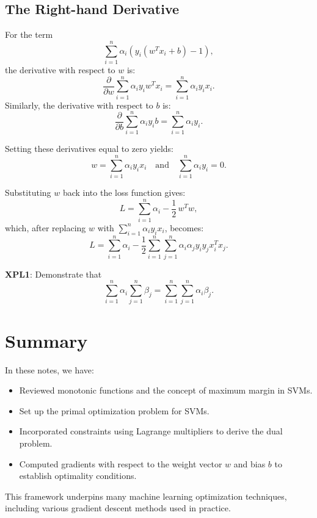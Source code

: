 \documentclass[11pt]{article}
\begin{document}
\subsection{The Right-hand Derivative}
For the term 
\[
\sum_{i=1}^{n} \alpha_i (y_i(w^T x_i + b) - 1),
\]
the derivative with respect to \(w\) is:
\[
\frac{\partial}{\partial w} \sum_{i=1}^{n} \alpha_i y_i w^T x_i = \sum_{i=1}^{n} \alpha_i y_i x_i.
\]
Similarly, the derivative with respect to \(b\) is:
\[
\frac{\partial}{\partial b} \sum_{i=1}^{n} \alpha_i y_i b = \sum_{i=1}^{n} \alpha_i y_i.
\]

Setting these derivatives equal to zero yields:
\[
w = \sum_{i=1}^{n} \alpha_i y_i x_i \quad \text{and} \quad \sum_{i=1}^{n} \alpha_i y_i = 0.
\]

Substituting \(w\) back into the loss function gives:
\[
L = \sum_{i=1}^{n} \alpha_i - \frac{1}{2}\, w^T w,
\]
which, after replacing \(w\) with \(\sum_{i=1}^{n} \alpha_i y_i x_i\), becomes:
\[
L = \sum_{i=1}^{n} \alpha_i - \frac{1}{2} \sum_{i=1}^{n} \sum_{j=1}^{n} \alpha_i \alpha_j y_i y_j x_i^T x_j.
\]

\begin{tcolorbox}
\textbf{XPL1}: Demonstrate that 
\[
\sum_{i=1}^n \alpha_i \sum_{j=1}^n \beta_j = \sum_{i=1}^n \sum_{j=1}^n \alpha_i\beta_j.
\]
\end{tcolorbox}

\section{Summary}
In these notes, we have:
\begin{itemize}
    \item Reviewed monotonic functions and the concept of maximum margin in SVMs.
    \item Set up the primal optimization problem for SVMs.
    \item Incorporated constraints using Lagrange multipliers to derive the dual problem.
    \item Computed gradients with respect to the weight vector \(w\) and bias \(b\) to establish optimality conditions.
\end{itemize}

This framework underpins many machine learning optimization techniques, including various gradient descent methods used in practice.
\end{document}
